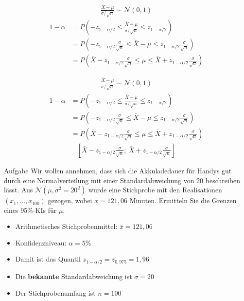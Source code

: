 \documentclass[t,11pt]{beamer}
\begin{document}
\begin{frame}
\begin{align*}
\frac{\bar{X}-\mu}{\sigma/\sqrt{n}}\sim \mathcal{N}(0,1)
\end{align*}
\begin{align*}
1-\alpha &= P(-z_{1-\alpha/2}\leq \frac{\bar{X}-\mu}{\sigma/\sqrt{n}} \leq z_{1-\alpha/2}) \\
&= P(-z_{1-\alpha/2} \frac{\sigma}{\sqrt{n}}\leq \bar{X}-\mu \leq z_{1-\alpha/2} \frac{\sigma}{\sqrt{n}}) \\
&= P(\bar{X} -z_{1-\alpha/2} \frac{\sigma}{\sqrt{n}}\leq \mu \leq \bar{X} + z_{1-\alpha/2} \frac{\sigma}{\sqrt{n}})
\end{align*}
\end{frame}

\begin{frame}
\begin{align*}
\frac{\bar{X}-\mu}{\sigma/\sqrt{n}}\sim \mathcal{N}(0,1)
\end{align*}
\begin{align*}
1-\alpha &= P(-z_{1-\alpha/2}\leq \frac{\bar{X}-\mu}{\sigma/\sqrt{n}} \leq z_{1-\alpha/2}) \\
&= P(-z_{1-\alpha/2} \frac{\sigma}{\sqrt{n}}\leq \bar{X}-\mu \leq z_{1-\alpha/2} \frac{\sigma}{\sqrt{n}}) \\
&= P(\bar{X} -z_{1-\alpha/2} \frac{\sigma}{\sqrt{n}}\leq \mu \leq \bar{X} + z_{1-\alpha/2} \frac{\sigma}{\sqrt{n}})
\end{align*}
\begin{align*}
\left[ \bar{X} - z_{1-\alpha/2} \frac{\sigma}{\sqrt{n}};~\bar{X} + z_{1-\alpha/2} \frac{\sigma}{\sqrt{n}}  \right]
\end{align*}
\end{frame}

\begin{frame}
	\begin{block}{Aufgabe}
		Wir wollen annehmen, dass sich die Akkuladedauer für Handys gut durch eine Normalverteilung mit einer Standardabweichung von 20 beschreiben lässt. Aus $\mathcal{N}(\mu, \sigma^2 = 20^2)$ wurde eine Stichprobe mit den Realisationen $(x_1,\dots,x_{100})$ gezogen, wobei $\bar{x} = 121,06$ Minuten. Ermitteln Sie die Grenzen eines 95\%-KIs für $\mu$.
	\end{block}
	\begin{itemize}
		\item Arithmetisches Stichprobenmittel: $\bar{x} = 121,06$
		\item Konfidenzniveau: $\alpha=5\%$
		\item Damit ist das Quantil $z_{1-\alpha/2}=z_{0,975}=1,96$
		\item Die \textbf{bekannte} Standardabweichung ist $\sigma=20$
		\item Der Stichprobenumfang ist $n=100$
	\end{itemize}
\end{frame}
\end{document}
